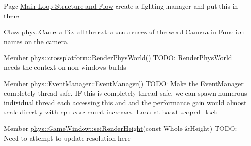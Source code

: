 \label{todo__todo000032}
\hypertarget{todo__todo000032}{}
 
\begin{DoxyDescription}
\item[Page \hyperlink{mainloop1}{Main Loop Structure and Flow} ]create a lighting manager and put this in there 
\end{DoxyDescription}

\label{todo__todo000002}
\hypertarget{todo__todo000002}{}
 
\begin{DoxyDescription}
\item[Class \hyperlink{classphys_1_1Camera}{phys::Camera} ]Fix all the extra occurences of the word Camera in Function names on the camera. 
\end{DoxyDescription}

\label{todo__todo000005}
\hypertarget{todo__todo000005}{}
 
\begin{DoxyDescription}
\item[Member \hyperlink{namespacephys_1_1crossplatform_a7c0ef3957423db484714c3356603c09d}{phys::crossplatform::RenderPhysWorld}() ]TODO: RenderPhysWorld needs the context on non-\/windows builds 
\end{DoxyDescription}

\label{todo__todo000007}
\hypertarget{todo__todo000007}{}
 
\begin{DoxyDescription}
\item[Member \hyperlink{classphys_1_1EventManager_a018b36588bf2a2e90536e64be060d6fc}{phys::EventManager::EventManager}() ]TODO: Make the EventManager completely thread safe. IF this is completely thread safe, we can spawn numerous individual thread each accessing this and and the performance gain would almost scale directly with cpu core count increases. Look at boost scoped\_\-lock 
\end{DoxyDescription}

\label{todo__todo000008}
\hypertarget{todo__todo000008}{}
 
\begin{DoxyDescription}
\item[Member \hyperlink{classphys_1_1GameWindow_a92e705ba782ff87dacd9ce487141fcab}{phys::GameWindow::setRenderHeight}(const Whole \&Height) ]TODO: Need to attempt to update resolution here 
\end{DoxyDescription}

\label{todo__todo000010}
\hypertarget{todo__todo000010}{}
 

